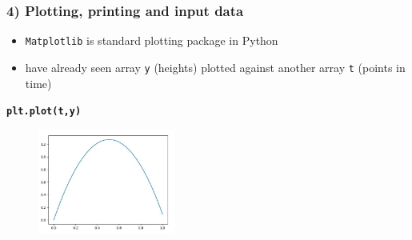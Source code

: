 \documentclass[14pt]{beamer}
\newcommand\blue[1]{{\color{blue} #1}}
\begin{document}
\begin{frame}[fragile]
\frametitle{4) Plotting, printing and input data}

\begin{itemize}
\item \texttt{Matplotlib} is standard plotting package in Python
\item have already seen array \texttt{y} (heights) plotted against another array \texttt{t} (points in time) 
\end{itemize}
\vspace*{-6mm}
\begin{center}
{\small\blue{
\textbf{
\texttt{plt.plot(t,y)}}}
}
\end{center}
\vspace*{-8mm}
\begin{figure}[ht]
	\centering
	\includegraphics[width=0.4\textwidth]{figures/LLp22a}
\end{figure}

\end{frame}

\end{document}
